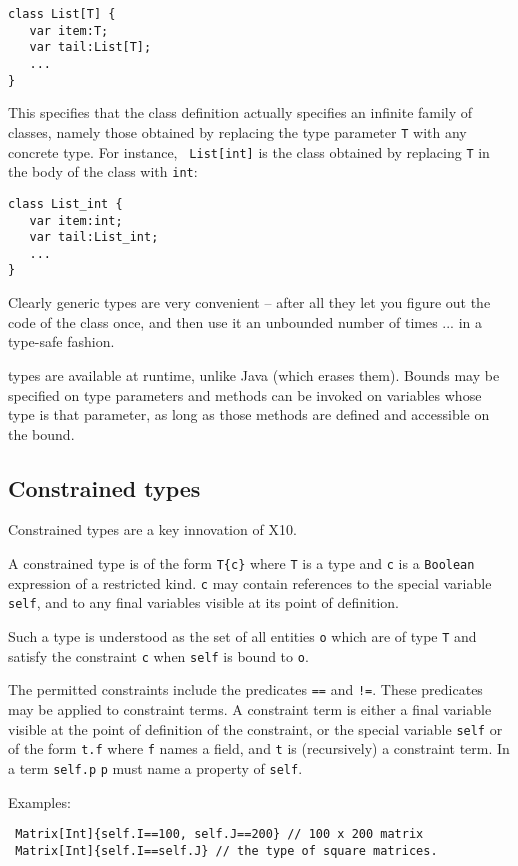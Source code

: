 {\footnotesize
\begin{verbatim}
class List[T] {
   var item:T;
   var tail:List[T];
   ...
}
\end{verbatim}}

This specifies that the class definition actually specifies an
infinite family of classes, namely those obtained by replacing the type
parameter {\tt T} with any concrete type. For instance, {\tt
List[int]} is the class obtained by replacing {\tt T} in the body of the class with {\tt int}:
{\footnotesize
\begin{verbatim}
class List_int {
   var item:int;
   var tail:List_int;
   ...
}
\end{verbatim}}

Clearly generic types are very convenient -- after all they let you
figure out the code of the class once, and then use it an unbounded
number of times ... in a type-safe fashion.

\Xten{} types are available at runtime, unlike Java (which erases
them).  Bounds may be specified on type parameters and methods can be
invoked on variables whose type is that parameter, as long as those
methods are defined and accessible on the bound.

\subsection{Constrained types}\label{x10-basics-constrained-types}
Constrained types are a key innovation of X10.

A constrained type is of the form {\tt T\{c\}} where {\tt T} is a
type and {\tt c} is a {\tt Boolean} expression of a restricted
kind. {\tt c} may contain references to the special variable
{\tt self}, and to any final variables visible at its point of
definition. 

Such a type is understood as the set of all entities {\tt o} which
are of type {\tt T} and satisfy the constraint {\tt c} when
{\tt self} is bound to {\tt o}.

The permitted constraints include the predicates {\tt ==} and
{\tt !=}.  These predicates may be applied to constraint terms. A
constraint term is either a final variable visible at the point of
definition of the constraint, or the special variable {\tt self} or
of the form {\tt t.f} where {\tt f} names a field, and {\tt t} is 
(recursively) a constraint term. In a term {\tt self.p} {\tt p} must
name a property of {\tt self}. 

Examples:
{\footnotesize
\begin{verbatim}
 Matrix[Int]{self.I==100, self.J==200} // 100 x 200 matrix
 Matrix[Int]{self.I==self.J} // the type of square matrices.
\end{verbatim}}

